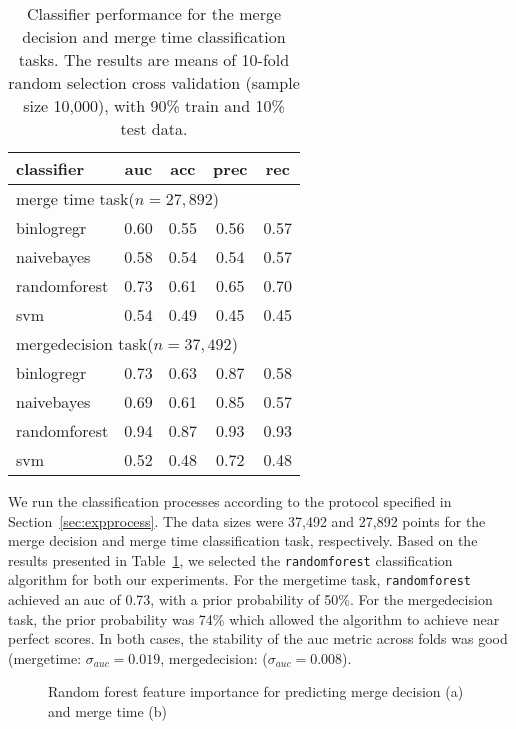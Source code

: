 \documentclass{acm_proc_article-sp}
\begin{document}
\begin{table}
  \centering
  \begin{tabular}{lcccc}
    \hline
    {\bf classifier} & {\sc auc} & {\sc acc} & {\sc prec} & {\sc rec} \\
    \hline
    \multicolumn{4}{l}{\textsf{merge time} task($n = 27,892$)} \\
    binlogregr    & 0.60 & 0.55 & 0.56 & 0.57  \\
    naivebayes    & 0.58 & 0.54 & 0.54 & 0.57  \\
    randomforest  & 0.73 & 0.61 & 0.65 & 0.70  \\
    svm           & 0.54 & 0.49 & 0.45 & 0.45  \\
    \hline
    \multicolumn{4}{l}{\textsf{mergedecision} task($n = 37,492$)} \\
    binlogregr    & 0.73 & 0.63 & 0.87 & 0.58  \\
    naivebayes    & 0.69 & 0.61 & 0.85 & 0.57  \\
    randomforest  & 0.94 & 0.87 & 0.93 & 0.93  \\
    svm           & 0.52 & 0.48 & 0.72 & 0.48  \\
    \hline
  \end{tabular}
  \caption{Classifier performance for the merge decision and merge time
  classification tasks. The results are means of 10-fold random selection
  cross validation (sample size 10,000), with 90\% train and 10\% test data.}
  \label{tab:classif-perf}
\end{table}

We run the classification processes according to the protocol specified in 
Section~\ref{sec:expprocess}. The data sizes
were 37,492 and 27,892 points for the \textsf{merge decision} and \textsf{merge time}
classification task, respectively.
Based on the results presented in Table~\ref{tab:classif-perf},
we selected the \texttt{randomforest} classification algorithm for
both our experiments. For the \textsf{mergetime} task, \texttt{randomforest}
achieved an {\sc auc} of 0.73, with a prior probability of 50\%. For 
the \textsf{mergedecision} task, the prior probability was 74\% which
allowed the algorithm to achieve near perfect scores. In both cases,
the stability of the {\sc auc} metric across folds was good 
(\textsf{mergetime}: $\sigma_{auc} = 0.019$, \textsf{mergedecision}: ($\sigma_{auc} = 0.008$).

\begin{figure*}
\centering
{}
\caption{Random forest feature importance for predicting merge decision (a) and merge time (b)}
\label{fig:varimp}
\end{figure*}
\end{document}
